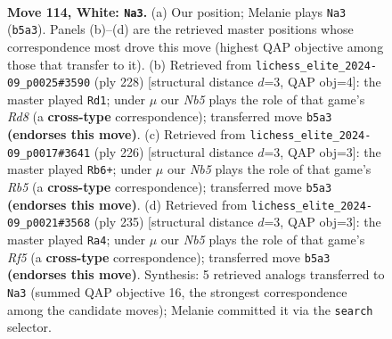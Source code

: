\documentclass[11pt]{article}
\begin{document}
\clearpage

\begin{figure}[p]\centering
\begin{subfigure}{0.46\textwidth}\centering
\resizebox{\linewidth}{!}{%
\newchessgame
\chessboard[
  setfen={8/5R2/8/1N1k2K1/6P1/8/7r/8 w - - 11 114},
  showmover=false,
  pgfstyle=straightmove, color=movearrow, markmove={b5-a3}
]}
\caption{}
\end{subfigure}\hfill
\begin{subfigure}{0.46\textwidth}\centering
\resizebox{\linewidth}{!}{%
\newchessgame
\chessboard[
  setfen={3R4/7k/5K2/5P2/8/6r1/8/8 w - - 25 115},
  showmover=false,
  pgfstyle=straightmove, color=movearrow, markmove={d8-d1}
]}
\caption{}
\end{subfigure}
\\[4pt]
\begin{subfigure}{0.46\textwidth}\centering
\resizebox{\linewidth}{!}{%
\newchessgame
\chessboard[
  setfen={8/7K/4k2P/1R6/8/8/8/6r1 w - - 35 114},
  showmover=false,
  pgfstyle=straightmove, color=movearrow, markmove={b5-b6}
]}
\caption{}
\end{subfigure}\hfill
\begin{subfigure}{0.46\textwidth}\centering
\resizebox{\linewidth}{!}{%
\newchessgame
\chessboard[
  setfen={8/8/8/8/5r2/6R1/4K2p/7k b - - 27 118},
  showmover=false,
  pgfstyle=straightmove, color=movearrow, markmove={f4-a4}
]}
\caption{}
\end{subfigure}
\caption{\textbf{Move 114, White: \texttt{Na3}.} (a) Our position; Melanie plays \texttt{Na3} (\texttt{b5a3}). Panels (b)--(d) are the retrieved master positions whose correspondence most drove this move (highest QAP objective among those that transfer to it). (b) Retrieved from \texttt{lichess\_elite\_2024-09\_p0025\#3590} (ply 228) [structural distance $d$=3, QAP obj=4]: the master played \texttt{Rd1}; under $\mu$ our \emph{Nb5} plays the role of that game's \emph{Rd8} (a \textbf{cross-type} correspondence); transferred move \texttt{b5a3} \textbf{(endorses this move)}. (c) Retrieved from \texttt{lichess\_elite\_2024-09\_p0017\#3641} (ply 226) [structural distance $d$=3, QAP obj=3]: the master played \texttt{Rb6+}; under $\mu$ our \emph{Nb5} plays the role of that game's \emph{Rb5} (a \textbf{cross-type} correspondence); transferred move \texttt{b5a3} \textbf{(endorses this move)}. (d) Retrieved from \texttt{lichess\_elite\_2024-09\_p0021\#3568} (ply 235) [structural distance $d$=3, QAP obj=3]: the master played \texttt{Ra4}; under $\mu$ our \emph{Nb5} plays the role of that game's \emph{Rf5} (a \textbf{cross-type} correspondence); transferred move \texttt{b5a3} \textbf{(endorses this move)}. Synthesis: 5 retrieved analogs transferred to \texttt{Na3} (summed QAP objective 16, the strongest correspondence among the candidate moves); Melanie committed it via the \texttt{search} selector.}
\label{fig:thought-m226}
\end{figure}
\end{document}
